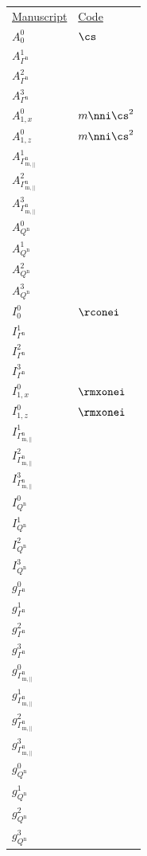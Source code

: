 \begin{tabular}{L{3cm} L{4cm}}
\underline{Manuscript} & \underline{Code} \\
$A_0^0$ & $\cs$\\
$A_{\Gamma^\mathrm{n}}^1$ & \\
$A_{\Gamma^\mathrm{n}}^2$ & \\
$A_{\Gamma^\mathrm{n}}^3$ & \\
$A_{1,x}^0$ & $m \nni \cs^2$\\
$A_{1,z}^0$ & $m \nni \cs^2$\\
$A_{\Gamma^\mathrm{n}_\mathrm{m,||}}^1$ & \\
$A_{\Gamma^\mathrm{n}_\mathrm{m,||}}^2$ & \\
$A_{\Gamma^\mathrm{n}_\mathrm{m,||}}^3$ & \\
$A_{Q^\mathrm{n}}^0$ & \\
$A_{Q^\mathrm{n}}^1$ & \\
$A_{Q^\mathrm{n}}^2$ & \\
$A_{Q^\mathrm{n}}^3$ & \\
$I_0^0$ & $\rconei$\\
$I_{\Gamma^\mathrm{n}}^1$ & \\
$I_{\Gamma^\mathrm{n}}^2$ & \\
$I_{\Gamma^\mathrm{n}}^3$ & \\
$I_{1,x}^0$ & $\rmxonei$\\
$I_{1,z}^0$ & $\rmxonei$\\
$I_{\Gamma^\mathrm{n}_\mathrm{m,||}}^1$ & \\
$I_{\Gamma^\mathrm{n}_\mathrm{m,||}}^2$ & \\
$I_{\Gamma^\mathrm{n}_\mathrm{m,||}}^3$ & \\
$I_{Q^\mathrm{n}}^0$ & \\
$I_{Q^\mathrm{n}}^1$ & \\
$I_{Q^\mathrm{n}}^2$ & \\
$I_{Q^\mathrm{n}}^3$ & \\
$g_{\Gamma^\mathrm{n}}^0$ & \\
$g_{\Gamma^\mathrm{n}}^1$ & \\
$g_{\Gamma^\mathrm{n}}^2$ & \\
$g_{\Gamma^\mathrm{n}}^3$ & \\
$g_{\Gamma^\mathrm{n}_\mathrm{m,||}}^0$ & \\
$g_{\Gamma^\mathrm{n}_\mathrm{m,||}}^1$ & \\
$g_{\Gamma^\mathrm{n}_\mathrm{m,||}}^2$ & \\
$g_{\Gamma^\mathrm{n}_\mathrm{m,||}}^3$ & \\
$g_{Q^\mathrm{n}}^0$ & \\
$g_{Q^\mathrm{n}}^1$ & \\
$g_{Q^\mathrm{n}}^2$ & \\
$g_{Q^\mathrm{n}}^3$ & \\
\end{tabular}

